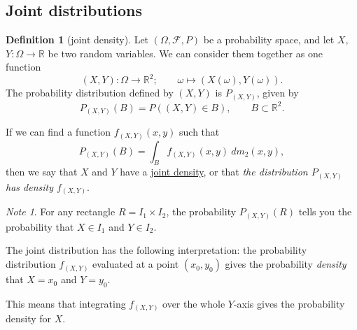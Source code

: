 \documentclass[a4paper,12pt]{scrreprt}
\newcommand{\R}{\mathbb{R}}
\newcommand{\defn}[1]{\ul{#1}}
\theoremstyle{definition}
\newtheorem{definition}{Definition}[section]
\theoremstyle{plain}
\theoremstyle{remark}
\newtheorem{note}{Note}[section]
\begin{document}
\subsection{Joint distributions}
\begin{definition}[joint density]
  \label{def:jointdensity}
  Let $(\Omega, \mathcal{F}, P)$ be a probability space, and let $X$, $Y\colon \Omega \to \R$ be two random variables. We can consider them together as one function
  \begin{equation*}
    (X, Y)\colon \Omega \to \R^{2};\qquad \omega \mapsto (X(\omega), Y(\omega)).
  \end{equation*}
  The probability distribution defined by $(X, Y)$ is $P_{(X, Y)}$, given by
  \begin{equation*}
    P_{(X, Y)}(B) = P\left((X, Y) \in B \right),\qquad B \subset \R^{2}.
  \end{equation*}

  If we can find a function $f_{(X, Y)}(x, y)$ such that
  \begin{equation*}
    P_{(X, Y)}(B) = \int_{B} f_{(X, Y)}(x, y)\ dm_{2}(x, y),
  \end{equation*}
  then we say that $X$ and $Y$ have a \defn{joint density}, or that \emph{the distribution $P_{(X, Y)}$ has density $f_{(X, Y)}$}.
\end{definition}

\begin{note}
  For any rectangle $R = I_{1} \times I_{2}$, the probability $P_{(X, Y)}(R)$ tells you the probability that $X \in I_{1}$ and $Y \in I_{2}$.

  The joint distribution has the following interpretation: the probability distribution $f_{(X, Y)}$ evaluated at a point $(x_{0}, y_{0})$ gives the probability \emph{density} that $X = x_{0}$ and $Y = y_{0}$.

  This means that integrating $f_{(X, Y)}$ over the whole $Y$-axis gives the probability density for $X$.
\end{note}
\end{document}
